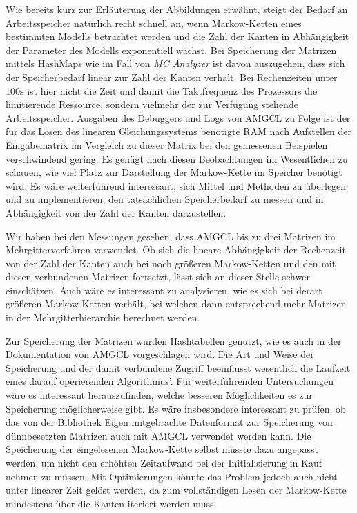 \documentclass[a4paper]{article}
\newcommand{\mc}{Markow-Kette}
\theoremstyle{nonumberplain}
\begin{document}
Wie bereits kurz zur Erläuterung der Abbildungen erwähnt, steigt der Bedarf an Arbeitsspeicher natürlich recht schnell an, wenn \mc{}n eines bestimmten Modells betrachtet werden und die Zahl der Kanten in Abhängigkeit der Parameter des Modells exponentiell wächst. Bei Speicherung der Matrizen mittels HashMaps wie im Fall von \textit{MC Analyzer} ist davon auszugehen, dass sich der Speicherbedarf linear zur Zahl der Kanten verhält.
Bei Rechenzeiten unter $100\mathrm{s}$ ist hier nicht die Zeit und damit die Taktfrequenz des Prozessors die limitierende Ressource, sondern vielmehr der zur Verfügung stehende Arbeitsspeicher. Ausgaben des Debuggers und Logs von AMGCL zu Folge ist der für das Lösen des linearen Gleichungssystems benötigte RAM nach Aufstellen der Eingabematrix im Vergleich zu dieser Matrix bei den gemessenen Beispielen verschwindend gering. Es genügt nach diesen Beobachtungen im Wesentlichen zu schauen, wie viel Platz zur Darstellung der \mc{} im Speicher benötigt wird. Es wäre weiterführend interessant, sich Mittel und Methoden zu überlegen und zu implementieren, den tatsächlichen Speicherbedarf zu messen und in Abhängigkeit von der Zahl der Kanten darzustellen.

Wir haben bei den Messungen gesehen, dass AMGCL bis zu drei Matrizen im Mehrgitterverfahren verwendet. Ob sich die lineare Abhängigkeit der Rechenzeit von der Zahl der Kanten auch bei noch größeren \mc{}n und den mit diesen verbundenen Matrizen fortsetzt, lässt sich an dieser Stelle schwer einschätzen. Auch wäre es interessant zu analysieren, wie es sich bei derart größeren \mc{}n verhält, bei welchen dann entsprechend mehr Matrizen in der Mehrgitterhierarchie berechnet werden. 

Zur Speicherung der Matrizen wurden Hashtabellen genutzt, wie es auch in der Dokumentation von AMGCL vorgeschlagen wird. Die Art und Weise der Speicherung und der damit verbundene Zugriff beeinflusst wesentlich die Laufzeit eines darauf operierenden Algorithmus'. Für weiterführenden Untersuchungen wäre es interessant herauszufinden, welche besseren Möglichkeiten es zur Speicherung möglicherweise gibt. Es wäre insbesondere interessant zu prüfen, ob das von der Bibliothek Eigen mitgebrachte Datenformat zur Speicherung von dünnbesetzten Matrizen auch mit AMGCL verwendet werden kann. Die Speicherung der eingelesenen \mc{} selbst müsste dazu angepasst werden, um nicht den erhöhten Zeitaufwand bei der Initialisierung in Kauf nehmen zu müssen. Mit Optimierungen könnte das Problem jedoch auch nicht unter linearer Zeit gelöst werden, da zum vollständigen Lesen der \mc{} mindestens über die Kanten iteriert werden muss.
\end{document}
